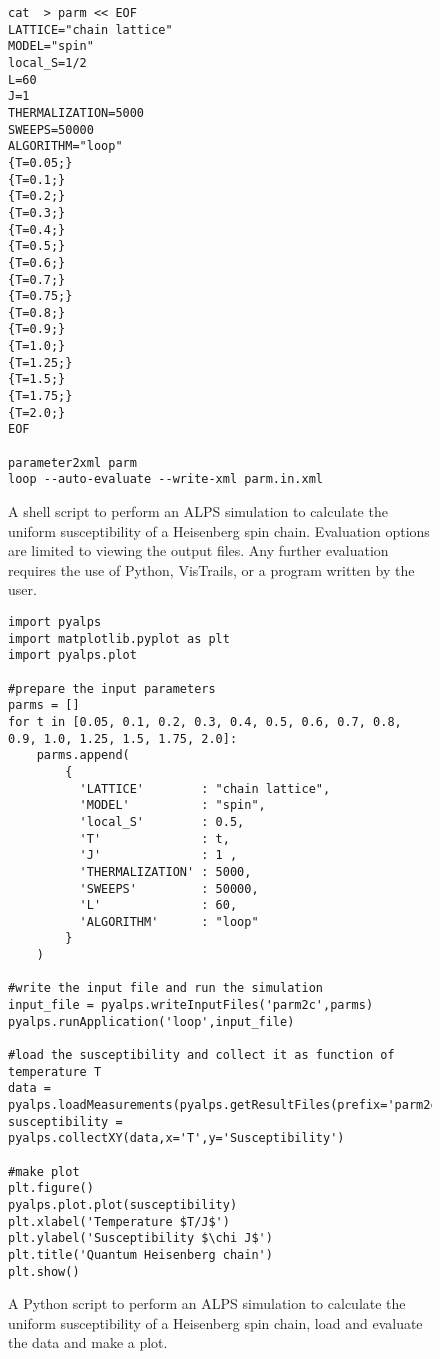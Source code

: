 \documentclass[12pt]{iopart}
\begin{document}
\begin{figure}
\begin{small}
\begin{verbatim}
cat  > parm << EOF
LATTICE="chain lattice"
MODEL="spin"
local_S=1/2
L=60
J=1
THERMALIZATION=5000
SWEEPS=50000
ALGORITHM="loop"
{T=0.05;}
{T=0.1;}
{T=0.2;}
{T=0.3;}
{T=0.4;}
{T=0.5;}
{T=0.6;}
{T=0.7;}
{T=0.75;}
{T=0.8;}
{T=0.9;}
{T=1.0;}
{T=1.25;}
{T=1.5;}
{T=1.75;}
{T=2.0;}
EOF

parameter2xml parm
loop --auto-evaluate --write-xml parm.in.xml
\end{verbatim}
\end{small}
\caption{A shell script to perform an ALPS simulation to calculate the uniform susceptibility of a Heisenberg spin chain. Evaluation options are limited to viewing the output files. Any further evaluation requires the use of Python, VisTrails, or a program written by the user.}
\label{fig:commandline}
\end{figure}


\begin{figure}
\begin{small}
\begin{verbatim}
import pyalps
import matplotlib.pyplot as plt
import pyalps.plot

#prepare the input parameters
parms = []
for t in [0.05, 0.1, 0.2, 0.3, 0.4, 0.5, 0.6, 0.7, 0.8, 0.9, 1.0, 1.25, 1.5, 1.75, 2.0]:
    parms.append(
        { 
          'LATTICE'        : "chain lattice", 
          'MODEL'          : "spin",
          'local_S'        : 0.5,
          'T'              : t,
          'J'              : 1 ,
          'THERMALIZATION' : 5000,
          'SWEEPS'         : 50000,
          'L'              : 60,
          'ALGORITHM'      : "loop"
        }
    )

#write the input file and run the simulation
input_file = pyalps.writeInputFiles('parm2c',parms)
pyalps.runApplication('loop',input_file)

#load the susceptibility and collect it as function of temperature T
data = pyalps.loadMeasurements(pyalps.getResultFiles(prefix='parm2c'),'Susceptibility')
susceptibility = pyalps.collectXY(data,x='T',y='Susceptibility')

#make plot
plt.figure()
pyalps.plot.plot(susceptibility)
plt.xlabel('Temperature $T/J$')
plt.ylabel('Susceptibility $\chi J$')
plt.title('Quantum Heisenberg chain')
plt.show()
\end{verbatim}
\end{small}
\caption{A Python script to perform an ALPS simulation to calculate the uniform susceptibility of a Heisenberg spin chain, load and evaluate the data and make a plot.}
\label{fig:python}
\end{figure}
\end{document}
